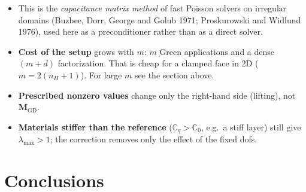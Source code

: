 \documentclass[11pt,a4paper]{article}
\begin{document}
\begin{itemize}
  \item This is the \emph{capacitance matrix method} of fast Poisson solvers on irregular domains (Buzbee, Dorr, George
        and Golub 1971; Proskurowski and Widlund 1976), used here as a preconditioner rather than as a direct solver.
  \item \textbf{Cost of the setup} grows with $m$: $m$ Green applications and a dense $(m+d)$ factorization. That is
        cheap for a clamped face in 2D ($m = 2(n_H+1)$). For large $m$ see the section above.
  \item \textbf{Prescribed nonzero values} change only the right-hand side (lifting), not $\mathbf{M}_{\mathrm{GD}}$.
  \item \textbf{Materials stiffer than the reference} ($\mathbb{C}_q > \mathbb{C}_0$, e.g.\ a stiff layer) still give
        $\lambda_{\max} > 1$; the correction removes only the effect of the fixed dofs.
\end{itemize}

\section*{Conclusions}
\end{document}
